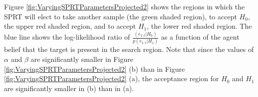 Figure \ref{fig:VaryingSPRTParametersProjected2} shows the regions in which the SPRT will elect to take another sample (the green shaded region), to accept $H_0$, the upper red shaded region, and to accept $H_1$, the lower red shaded region. The blue line shows the log-likelihood ratio of $\frac{(e_{1:t} | H_0)}{p(e_{1:t} | H_1)}$ as a function of the agent belief that the target is present in the search region. 
Note that since the values of $\alpha$ and $\beta$ are significantly smaller in Figure \ref{fig:VaryingSPRTParametersProjected2} (b) than in Figure \ref{fig:VaryingSPRTParametersProjected2} (a), the acceptance region for $H_0$ and $H_1$ are significantly smaller in (b) than in (a).

\par


